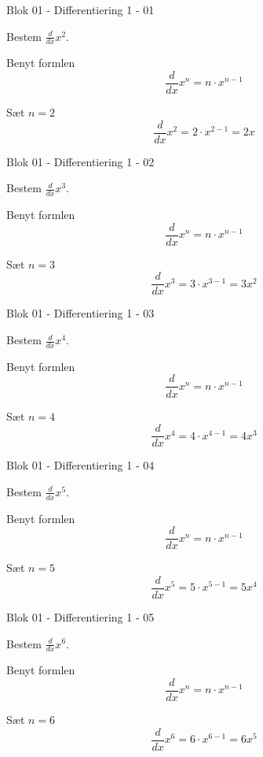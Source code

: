 \documentclass{article}
\begin{document}

\tableofcontents
\newpage

\begin{exercise}{Blok 01 - Differentiering 1 - 01}

Bestem $\frac{d}{dx} x^2$.


\hint

Benyt formlen
\[
\frac{d}{dx} x^n = n \cdot x^{n - 1}
\]

\hint

Sæt $n = 2$
\[
\frac{d}{dx} x^2 = 2 \cdot x^{2 - 1} = 2 x
\]
\end{exercise}

\begin{exercise}{Blok 01 - Differentiering 1 - 02}

Bestem $\frac{d}{dx} x^3$.


\hint

Benyt formlen
\[
\frac{d}{dx} x^n = n \cdot x^{n - 1}
\]

\hint

Sæt $n = 3$
\[
\frac{d}{dx} x^3 = 3 \cdot x^{3 - 1} = 3 x^2
\]
\end{exercise}

\begin{exercise}{Blok 01 - Differentiering 1 - 03}

Bestem $\frac{d}{dx} x^4$.


\hint

Benyt formlen
\[
\frac{d}{dx} x^n = n \cdot x^{n - 1}
\]

\hint

Sæt $n = 4$
\[
\frac{d}{dx} x^4 = 4 \cdot x^{4 - 1} = 4 x^3
\]
\end{exercise}

\begin{exercise}{Blok 01 - Differentiering 1 - 04}

Bestem $\frac{d}{dx} x^5$.


\hint

Benyt formlen
\[
\frac{d}{dx} x^n = n \cdot x^{n - 1}
\]

\hint

Sæt $n = 5$
\[
\frac{d}{dx} x^5 = 5 \cdot x^{5 - 1} = 5 x^4
\]
\end{exercise}

\begin{exercise}{Blok 01 - Differentiering 1 - 05}

Bestem $\frac{d}{dx} x^6$.


\hint

Benyt formlen
\[
\frac{d}{dx} x^n = n \cdot x^{n - 1}
\]

\hint

Sæt $n = 6$
\[
\frac{d}{dx} x^6 = 6 \cdot x^{6 - 1} = 6 x^5
\]
\end{exercise}
\end{document}
